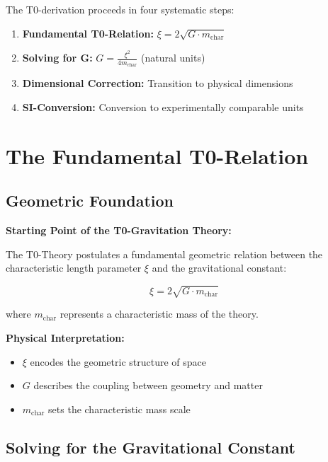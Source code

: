 \documentclass[12pt,a4paper]{article}
\begin{document}
	The T0-derivation proceeds in four systematic steps:
	
	\begin{enumerate}
		\item \textbf{Fundamental T0-Relation:} $\xi = 2\sqrt{G \cdot m_{\text{char}}}$
		\item \textbf{Solving for G:} $G = \frac{\xi^2}{4m_{\text{char}}}$ (natural units)
		\item \textbf{Dimensional Correction:} Transition to physical dimensions
		\item \textbf{SI-Conversion:} Conversion to experimentally comparable units
	\end{enumerate}
	
	\section{The Fundamental T0-Relation}
	
	\subsection{Geometric Foundation}
	
	\begin{derivation}
		\textbf{Starting Point of the T0-Gravitation Theory:}
		
		The T0-Theory postulates a fundamental geometric relation between the characteristic length parameter $\xi$ and the gravitational constant:
		
		\begin{equation}
			\xi = 2\sqrt{G \cdot m_{\text{char}}}
			\label{eq:t0_fundamental}
		\end{equation}
		
		where $m_{\text{char}}$ represents a characteristic mass of the theory.
		
		\textbf{Physical Interpretation:}
		\begin{itemize}
			\item $\xi$ encodes the geometric structure of space
			\item $G$ describes the coupling between geometry and matter
			\item $m_{\text{char}}$ sets the characteristic mass scale
		\end{itemize}
	\end{derivation}
	
	\subsection{Solving for the Gravitational Constant}
	
\end{document}
